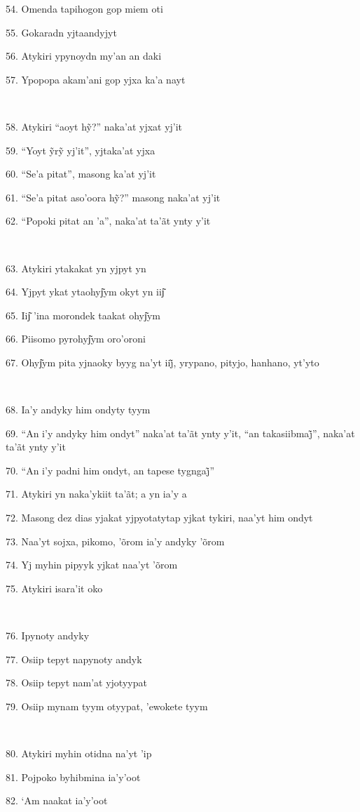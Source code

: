 54. Omenda tapihogon gop miem oti

55. Gokaradn yjtaandyjyt

56. Atykiri ypynoydn my'an an daki

57. Ypopopa akam'ani gop yjxa ka'a nayt

~

58. Atykiri ``aoyt hỹ?'' naka’at yjxat yj’it

59. ``Yoyt ỹrỹ yj’it'', yjtaka’at yjxa

60. ``Se'a pitat'', masong ka'at yj'it

61. ``Se’a pitat aso’oora hỹ?'' masong naka’at yj’it

62. ``Popoki pitat an 'a'', naka'at ta'ãt ynty y'it

~

63. Atykiri ytakakat yn yjpyt yn

64. Yjpyt ykat ytaohyj͂ym okyt yn iij͂

65. Iij͂ 'ina morondek taakat ohyj͂ym

66. Piisomo pyrohyj͂ym oro'oroni

67. Ohyj͂ym pita yjnaoky byyg na’yt iij̃, yrypano, pityjo, hanhano, yt’yto

~

68. Ia'y andyky him ondyty tyym

69. ``An i’y andyky him ondyt'' naka’at ta’ãt ynty y’it, ``an takasiibmaj̃'', naka’at ta’ãt ynty y’it

70. ``An i’y padni him ondyt, an tapese tygngaj̃''

71. Atykiri yn naka'ykiit ta'ãt; a yn ia'y a

72. Masong dez dias yjakat yjpyotatytap yjkat tykiri, naa'yt him ondyt

73. Naa'yt sojxa, pikomo, 'õrom ia'y andyky 'õrom

74. Yj myhin pipyyk yjkat naa'yt 'õrom

75. Atykiri isara'it oko

~


76. Ipynoty andyky

77. Osiip tepyt napynoty andyk

78. Osiip tepyt nam'at yjotyypat

79. Osiip mynam tyym otyypat, 'ewokete tyym

~

80. Atykiri myhin otidna na'yt 'ip

81. Pojpoko byhibmina ia'y'oot

82. `Am naakat ia'y'oot

